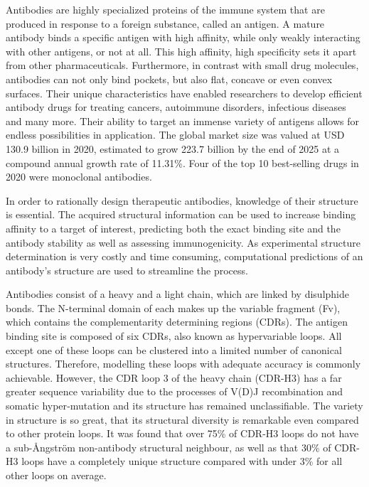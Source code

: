 \documentclass[12pt]{article}
\begin{document}
Antibodies are highly specialized proteins of the immune system that
are produced in response to a foreign substance, called an antigen. A
mature antibody binds a specific antigen with high affinity, while
only weakly interacting with other antigens, or not at all. This high
affinity, high specificity sets it apart from other pharmaceuticals.
Furthermore, in contrast with small drug molecules, antibodies can not
only bind pockets, but also flat, concave or even convex
surfaces\cite{Tavers2001}. Their unique characteristics have enabled 
researchers to develop efficient antibody drugs for treating cancers,
autoimmune disorders, infectious diseases and many more\cite{Lu2020}.
Their ability to target an immense variety of antigens allows for
endless possibilities in application. The global market size was
valued at USD 130.9 billion in 2020, estimated to grow 223.7 billion
by the end of 2025 at a compound annual growth rate of
11.31\%\cite{market2020}. Four of the top 10 best-selling drugs in
2020 were monoclonal antibodies\cite{Urquhart2021}.

In order to rationally design therapeutic antibodies, knowledge of
their structure is essential. The acquired structural information can
be used to increase binding affinity to a target of interest,
predicting both the exact binding site and the antibody stability as
well as assessing immunogenicity\cite{Abhinandan2007}. As
experimental structure determination is very costly and time
consuming, computational predictions of an antibody's structure are
used to streamline the process.

Antibodies consist of a heavy and a light chain, which are linked by
disulphide bonds. The N-terminal domain of each makes up the variable
fragment (Fv), which contains the complementarity determining regions
(CDRs). The antigen binding site is composed of six CDRs, also known
as hypervariable loops. All except one of these loops can be clustered
into a limited number of canonical structures. Therefore, modelling
these loops with adequate accuracy is commonly
achievable\cite{North2011,Weitzner2015}. However, the CDR loop 3 of
the 
heavy chain (CDR-H3) has a far greater sequence variability due to the
processes of V(D)J recombination and somatic hyper‐mutation and its
structure has remained unclassifiable\cite{Finn2016}. The variety in
structure is so great, that its structural diversity is remarkable
even compared to other protein loops\cite{Regep2017}. It was found
that over 75\% of CDR-H3 loops do not have a sub-{\AA}ngstr\"{o}m non-antibody
structural neighbour, as well as that 30\% of CDR-H3 loops have a
completely unique structure compared with under 3\% for all other
loops on average\cite{Regep2017}.
\end{document}
